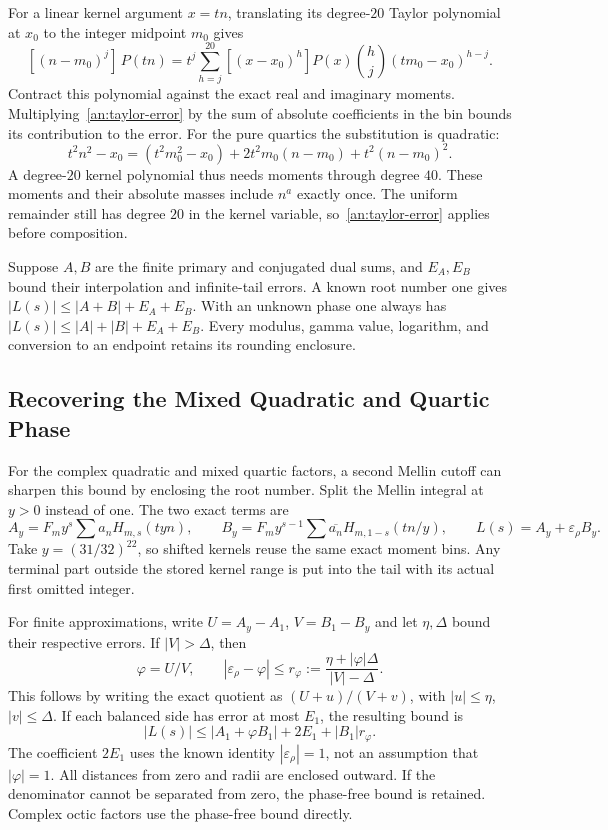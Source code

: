 For a linear kernel argument $x=tn$, translating its degree-$20$
Taylor polynomial at $x_0$ to the integer midpoint $m_0$ gives
\[
 [ (n-m_0)^j ]\,P(tn)
 =t^j\sum_{h=j}^{20}[ (x-x_0)^h ]P(x)
                 \binom hj(tm_0-x_0)^{h-j}.
\]
Contract this polynomial against the exact real and imaginary moments.
Multiplying~\eqref{an:taylor-error} by the sum of absolute coefficients
in the bin bounds its contribution to the error.
For the pure quartics the substitution is quadratic:
\[
 t^2n^2-x_0=(t^2m_0^2-x_0)+2t^2m_0(n-m_0)+t^2(n-m_0)^2.
\]
A degree-$20$ kernel polynomial thus needs moments through degree
$40$. These moments and their absolute masses include $n^a$ exactly
once. The uniform remainder still has degree $20$ in the kernel
variable, so~\eqref{an:taylor-error} applies before composition.

Suppose $A,B$ are the finite primary and conjugated dual sums, and
$E_A,E_B$ bound their interpolation and infinite-tail errors. A known
root number one gives $|L(s)|\leq|A+B|+E_A+E_B$. With an unknown
phase one always has $|L(s)|\leq|A|+|B|+E_A+E_B$.
Every modulus, gamma value, logarithm, and conversion to an endpoint
retains its rounding enclosure.

\subsection{Recovering the Mixed Quadratic and Quartic Phase}
\label{an:two-cutoffs}

For the complex quadratic and mixed quartic factors, a second Mellin
cutoff can sharpen this bound by enclosing the root number. Split the
Mellin integral at $y>0$ instead of one. The two exact terms are
\[
 A_y=F_m y^s\sum a_nH_{m,s}(tyn),\qquad
 B_y=F_m y^{s-1}\sum\overline{a_n}H_{m,1-s}(tn/y),
 \qquad L(s)=A_y+\varepsilon_\rho B_y.
\]
Take $y=(31/32)^{22}$, so shifted kernels reuse the same exact moment
bins. Any terminal part outside the stored kernel range is put into
the tail with its actual first omitted integer.

For finite approximations, write $U=A_y-A_1$, $V=B_1-B_y$ and let
$\eta,\Delta$ bound their respective errors. If $|V|>\Delta$, then
\begin{equation}\label{an:phase-disk}
 \varphi=U/V,\qquad
 |\varepsilon_\rho-\varphi|
 \leq r_\varphi:=\frac{\eta+|\varphi|\Delta}{|V|-\Delta}.
\end{equation}
This follows by writing the exact quotient as
$(U+u)/(V+v)$, with $|u|\leq\eta$, $|v|\leq\Delta$.
If each balanced side has error at most $E_1$, the resulting bound is
\begin{equation}\label{an:phase-upper}
 |L(s)|\leq|A_1+\varphi B_1|+2E_1+|B_1|r_\varphi.
\end{equation}
The coefficient $2E_1$ uses the known identity
$|\varepsilon_\rho|=1$, not an assumption that $|\varphi|=1$.
All distances from zero and radii are enclosed outward. If the
denominator cannot be separated from zero, the phase-free bound is
retained. Complex octic factors use the phase-free bound directly.

